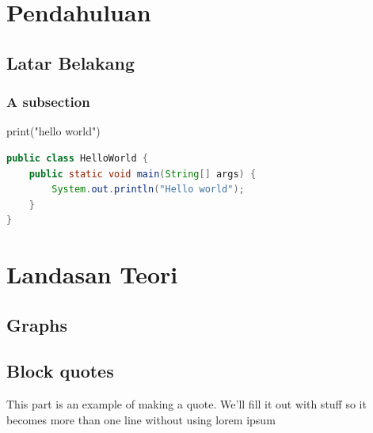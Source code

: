 \documentclass[oneside,12pt]{book}
\renewenvironment{quote}{%
	\list{}{%
		\leftmargin0.5in   %
		\rightmargin0cm
	}
	\item\relax
}
{\endlist}
\begin{document}
\begin{doublespace}

\chapter{Pendahuluan}
\section{Latar Belakang}
\lipsum[1-10]
\subsection{A subsection}
\lipsum[1-2]

\begin{pycode}
print("hello world")
\end{pycode}

\begin{lstlisting}[caption=Manual input, label={listing-java-manual},language=java,style=skripsilisting]
public class HelloWorld {
	public static void main(String[] args) {
		System.out.println("Hello world");
	}
}
\end{lstlisting}



\chapter{Landasan Teori}
\lipsum[1-2]

\section{Graphs}

\section{Block quotes}
This part is an example of making a quote. We'll fill it out with stuff so it becomes more than one line without using lorem ipsum
\begin{quote}
	\lipsum[1-2] \parencite{wombat2016} %
\end{quote}


\end{doublespace}
\end{document}
